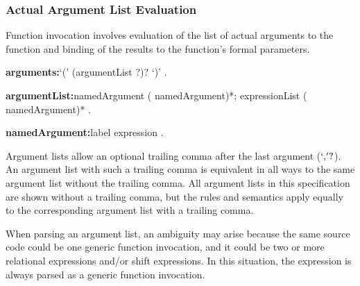 \documentclass{article}
\begin{document}



\subsubsection{Actual Argument List Evaluation}

\LMHash{}
Function invocation involves evaluation of the list of actual arguments to the function and binding of the results to the function's formal parameters.

\begin{grammar}
{\bf arguments:}`(' (argumentList \gcomma{}?)? `)'
  .

{\bf argumentList:}namedArgument (\gcomma{} namedArgument)*;
  expressionList (\gcomma{} namedArgument)*
  .

{\bf namedArgument:}label expression
  .
\end{grammar}

\LMHash{}
Argument lists allow an optional trailing comma after the last argument ($`,\!'?$).
An argument list with such a trailing comma is equivalent in all ways to the same argument list without the trailing comma.
All argument lists in this specification are shown without a trailing comma, but the rules and semantics apply equally to the corresponding argument list with a trailing comma.

\LMHash{}
When parsing an argument list, an ambiguity may arise because the same source code could be one generic function invocation, and it could be two or more relational expressions and/or shift expressions.
In this situation, the expression is always parsed as a generic function invocation.


\end{document}
